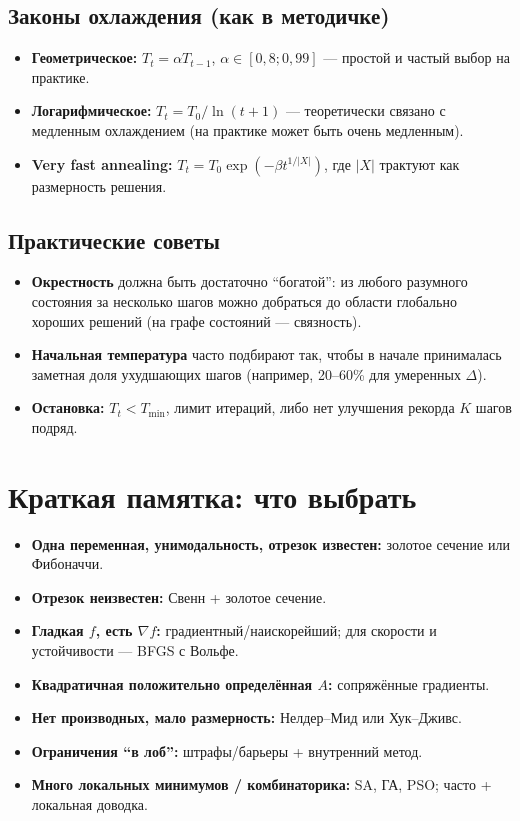 \documentclass[12pt,a4paper]{article}
\newcommand{\grad}{\nabla}
\begin{document}
\subsection{Законы охлаждения (как в методичке)}
\begin{itemize}
  \item \textbf{Геометрическое:} \(T_{t}=\alpha T_{t-1}\), \(\alpha\in[0{,}8;0{,}99]\) --- простой и частый выбор на практике.
  \item \textbf{Логарифмическое:} \(T_t=T_0/\ln(t+1)\) --- теоретически связано с медленным охлаждением (на практике может быть очень медленным).
  \item \textbf{Very fast annealing:} \(T_t=T_0\exp(-\beta t^{1/|X|})\), где \(|X|\) трактуют как размерность решения.
\end{itemize}

\subsection{Практические советы}
\begin{itemize}
  \item \textbf{Окрестность} должна быть достаточно ``богатой'': из любого разумного состояния за несколько шагов можно добраться до области глобально хороших решений (на графе состояний --- связность).
  \item \textbf{Начальная температура} часто подбирают так, чтобы в начале принималась заметная доля ухудшающих шагов (например, 20--60\% для умеренных \(\Delta\)).
  \item \textbf{Остановка:} \(T_t<T_{\min}\), лимит итераций, либо нет улучшения рекорда \(K\) шагов подряд.
\end{itemize}

\section{Краткая памятка: что выбрать}
\begin{itemize}
  \item \textbf{Одна переменная, унимодальность, отрезок известен:} золотое сечение или Фибоначчи.
  \item \textbf{Отрезок неизвестен:} Свенн + золотое сечение.
  \item \textbf{Гладкая \(f\), есть \(\grad f\):} градиентный/наискорейший; для скорости и устойчивости --- BFGS с Вольфе.
  \item \textbf{Квадратичная положительно определённая \(A\):} сопряжённые градиенты.
  \item \textbf{Нет производных, мало размерность:} Нелдер--Мид или Хук--Дживс.
  \item \textbf{Ограничения ``в лоб'':} штрафы/барьеры + внутренний метод.
  \item \textbf{Много локальных минимумов / комбинаторика:} SA, ГА, PSO; часто + локальная доводка.
\end{itemize}
\end{document}
